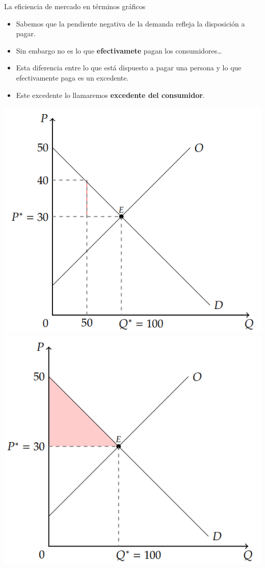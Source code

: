 \documentclass{beamer}
\begin{document}
\begin{frame}{La eficiencia de mercado en términos gráficos}
  \begin{itemize}
    \item Sabemos que la pendiente negativa de la demanda refleja la disposición a pagar.
    \item Sin embargo no es lo que \textbf{efectivamete} pagan los consumidores\dots
    \item Esta diferencia entre lo que está dispuesto a pagar una persona y lo que efectivamente paga es un excedente.
    \item Este excedente lo llamaremos \textbf{excedente del consumidor}.
  \end{itemize}
  \centering
  \includegraphics[scale=0.4]{../Figures/C17.5.png}
  \includegraphics[scale=0.4]{../Figures/C17.6.png}
\end{frame}
\end{document}
